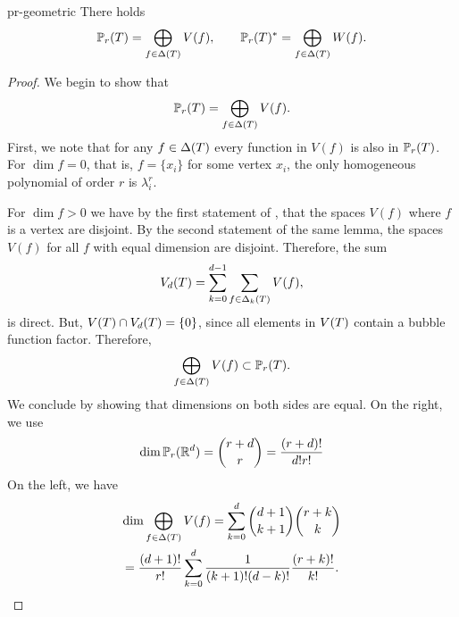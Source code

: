 \begin{Lemma}{pr-geometric}
  There holds
  \begin{gather}
    \mathbb P_r(T) = \bigoplus_{f\in\Delta(T)}V(f),
    \qquad
    \mathbb P_r(T)^* = \bigoplus_{f\in\Delta(T)}W(f).
  \end{gather}
\end{Lemma}

\begin{proof}
  We begin to show that
  \begin{gather*}
    \mathbb P_r(T) = \bigoplus_{f\in\Delta(T)}V(f).
  \end{gather*}
  First, we note that for any $f\in\Delta(T)$ every function in $V(f)$
  is also in $\mathbb P_r(T)$.  For $\dim f=0$, that is, $f=\{x_i\}$ for some
  vertex $x_i$, the only homogeneous polynomial of order $r$ is $\lambda_i^r$.

  For $\dim f > 0$ we have by the first statement of
  , that the spaces $V(f)$
  where $f$ is a vertex are disjoint. By the second statement of the
  same lemma, the spaces $V(f)$ for all $f$ with equal dimension are
  disjoint. Therefore, the sum
  \begin{gather*}
    V_d(T) = \sum_{k=0}^{d-1} \sum_{f\in \Delta_k(T)} V(f),
  \end{gather*}
  is direct. But, $V(T) \cap V_d(T) = \{0\}$, since all elements in
  $V(T)$ contain a bubble function factor. Therefore,
  \begin{gather*}
    \bigoplus_{f\in\Delta(T)}V(f) \subset \mathbb P_r(T).
  \end{gather*}
  We conclude by showing that dimensions on both sides are equal.
  On the right, we use
  \begin{gather*}
    \dim \mathbb P_r(\mathbb R^d) = \binom{r+d}{r} = \frac{(r+d)!}{d!r!}
  \end{gather*}
  On the left, we have
  \begin{multline*}
    \dim \bigoplus_{f\in\Delta(T)}V(f) =
    \sum_{k=0}^{d} \binom{d+1}{k+1} \binom{r+k}{k}
    \\
    = \frac{(d+1)!}{r!}
    \sum_{k=0}^{d} \frac{1}{(k+1)!(d-k)!} \frac{(r+k)!}{k!}.
  \end{multline*}



\end{proof}
